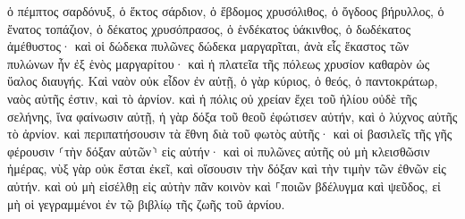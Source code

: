 \documentclass[twoside, 9pt]{extreport}
\begin{document}
ὁ πέμπτος σαρδόνυξ, ὁ ἕκτος σάρδιον, ὁ ἕβδομος χρυσόλιθος, ὁ ὄγδοος βήρυλλος, ὁ ἔνατος τοπάζιον, ὁ δέκατος χρυσόπρασος, ὁ ἑνδέκατος ὑάκινθος, ὁ δωδέκατος ἀμέθυστος· 
καὶ οἱ δώδεκα πυλῶνες δώδεκα μαργαρῖται, ἀνὰ εἷς ἕκαστος τῶν πυλώνων ἦν ἐξ ἑνὸς μαργαρίτου· καὶ ἡ πλατεῖα τῆς πόλεως χρυσίον καθαρὸν ὡς ὕαλος διαυγής. 
Καὶ ναὸν οὐκ εἶδον ἐν αὐτῇ, ὁ γὰρ κύριος, ὁ θεός, ὁ παντοκράτωρ, ναὸς αὐτῆς ἐστιν, καὶ τὸ ἀρνίον. 
καὶ ἡ πόλις οὐ χρείαν ἔχει τοῦ ἡλίου οὐδὲ τῆς σελήνης, ἵνα φαίνωσιν αὐτῇ, ἡ γὰρ δόξα τοῦ θεοῦ ἐφώτισεν αὐτήν, καὶ ὁ λύχνος αὐτῆς τὸ ἀρνίον. 
καὶ περιπατήσουσιν τὰ ἔθνη διὰ τοῦ φωτὸς αὐτῆς· καὶ οἱ βασιλεῖς τῆς γῆς φέρουσιν ⸂τὴν δόξαν αὐτῶν⸃ εἰς αὐτήν· 
καὶ οἱ πυλῶνες αὐτῆς οὐ μὴ κλεισθῶσιν ἡμέρας, νὺξ γὰρ οὐκ ἔσται ἐκεῖ, 
καὶ οἴσουσιν τὴν δόξαν καὶ τὴν τιμὴν τῶν ἐθνῶν εἰς αὐτήν. 
καὶ οὐ μὴ εἰσέλθῃ εἰς αὐτὴν πᾶν κοινὸν καὶ ⸀ποιῶν βδέλυγμα καὶ ψεῦδος, εἰ μὴ οἱ γεγραμμένοι ἐν τῷ βιβλίῳ τῆς ζωῆς τοῦ ἀρνίου. 
\end{document}
